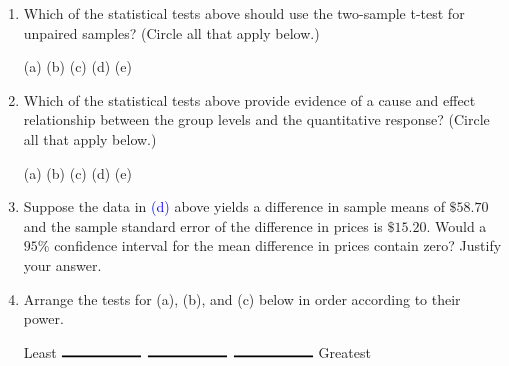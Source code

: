 \documentclass[12pt]{article}
\begin{document}
\begin{enumerate}[leftmargin=\labelsep]
\item Which of the statistical tests above should use the two-sample t-test for unpaired samples? (Circle all that apply below.)
\vspace{1cm}
\begin{center}{(a) \hspace{3cm}(b) \hspace{3cm} (c) \hspace{3cm} (d) \hspace{3cm} (e)}\end{center}
\vspace{1cm}
\item Which of the statistical tests above provide evidence of a cause and effect relationship between the group levels and the quantitative response? (Circle all that apply below.)
\vspace{1cm}
\begin{center}{(a) \hspace{3cm}(b) \hspace{3cm} (c) \hspace{3cm} (d) \hspace{3cm} (e)}\end{center}
\vspace{1cm}
\item Suppose the data in \textcolor{blue}{(d)} above yields a difference in sample means of $\$58.70$ and the sample standard error of the difference in prices is $\$15.20$. Would a $95\%$ confidence interval for the mean difference in prices contain zero? Justify your answer. 
\vspace{3cm}

\item Arrange the tests for (a), (b), and (c) below in order according to their power. 
\vspace{2cm}
\begin{center}{Least \hspace{0.4mm}$\rule{2cm}{0.5mm}$ \hspace{3cm} $\rule{2cm}{0.5mm}$ \hspace{3cm}$\rule{2cm}{0.5mm}$ \hspace{0.4mm} Greatest}\end{center}


\end{enumerate}
\end{document}
